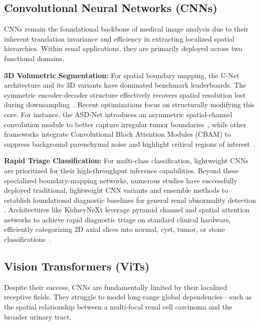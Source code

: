 \documentclass[pdflatex,sn-mathphys-num]{sn-jnl}%
\begin{document}
\subsection{Convolutional Neural Networks (CNNs)}
CNNs remain the foundational backbone of medical image analysis due to their inherent translation invariance and efficiency in extracting localized spatial hierarchies. Within renal applications, they are primarily deployed across two functional domains.

\textbf{3D Volumetric Segmentation:} For spatial boundary mapping, the U-Net architecture and its 3D variants have dominated benchmark leaderboards. The symmetric encoder-decoder structure effectively recovers spatial resolution lost during downsampling~\cite{abdelrahman2022deep}. Recent optimizations focus on structurally modifying this core. For instance, the ASD-Net introduces an asymmetric spatial-channel convolution module to better capture irregular tumor boundaries~\cite{ji2024asdnet}, while other frameworks integrate Convolutional Block Attention Modules (CBAM) to suppress background parenchymal noise and highlight critical regions of interest~\cite{gohil2024kidney}.

\textbf{Rapid Triage Classification:} For multi-class classification, lightweight CNNs are prioritized for their high-throughput inference capabilities. Beyond these specialized boundary-mapping networks, numerous studies have successfully deployed traditional, lightweight CNN variants and ensemble methods to establish foundational diagnostic baselines for general renal abnormality detection \cite{alzubi2022kidney, bhandari2023lightweight, rathva2025ensemble, tarul2025empirical, pimpalkar2025fine, abdelrahman2023efficientnet, zhao2023automatic, chen20215d}. Architectures like KidneyNeXt leverage pyramid channel and spatial attention networks to achieve rapid diagnostic triage on standard clinical hardware, efficiently categorizing 2D axial slices into normal, cyst, tumor, or stone classifications~\cite{alqahtani2025kidneynext}.

\subsection{Vision Transformers (ViTs)}
Despite their success, CNNs are fundamentally limited by their localized receptive fields. They struggle to model long-range global dependencies—such as the spatial relationship between a multi-focal renal cell carcinoma and the broader urinary tract. 
\end{document}
